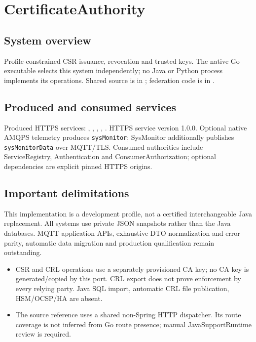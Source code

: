 \documentclass[a4paper]{arrowhead}
\begin{document}
\ArrowheadSetup
\section{CertificateAuthority}
\subsection{System overview}
Profile-constrained CSR issuance, revocation and trusted keys. The native Go executable selects this system independently; no Java or Python process implements its operations. Shared source is in ; federation code is in .
\subsection{Produced and consumed services}
Produced HTTPS services: , \allowbreak {}, \allowbreak {}, \allowbreak {}, \allowbreak {}.
HTTPS service version 1.0.0. Optional native AMQPS telemetry produces \texttt{sysMonitor}; SysMonitor additionally publishes \texttt{sysMonitorData} over MQTT/TLS. Consumed authorities include ServiceRegistry, Authentication and ConsumerAuthorization; optional dependencies are explicit pinned HTTPS origins.
\subsection{Important delimitations}
This implementation is a development profile, not a certified interchangeable Java replacement. All systems use private JSON snapshots rather than the Java databases. MQTT application APIs, exhaustive DTO normalization and error parity, automatic data migration and production qualification remain outstanding.
\begin{itemize}
\item CSR and CRL operations use a separately provisioned CA key; no CA key is generated/copied by this port. CRL export does not prove enforcement by every relying party. Java SQL import, automatic CRL file publication, HSM/OCSP/HA are absent.
\item The source reference uses a shared non-Spring HTTP dispatcher. Its route coverage is not inferred from Go route presence; manual JavaSupportRuntime review is required.
\end{itemize}
\end{document}
